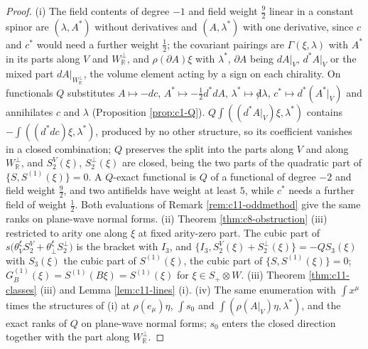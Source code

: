 \begin{proof}
(i) The field contents of degree $-1$ and field weight $\tfrac92$ linear in a constant spinor are $(\lambda,A^*)$ without derivatives and $(A,\lambda^*)$ with one derivative, since $c$ and $c^*$ would need a further weight $\tfrac12$; the covariant pairings are $\Gamma(\xi,\lambda)$ with $A^*$ in its parts along $V$ and $W_{\mathbb R}^\perp$, and $\rho(\partial A)\xi$ with $\lambda^*$, $\partial A$ being $dA|_V$, $d^*A|_V$ or the mixed part $dA|_{W_{\mathbb R}^\perp}$, the volume element acting by a sign on each chirality. On functionals $Q$ substitutes $A\mapsto-dc$, $A^*\mapsto-\tfrac12d^*dA$, $\lambda^*\mapsto{\not d}\lambda$, $c^*\mapsto d^*(A^*|_V)$ and annihilates $c$ and $\lambda$ (Proposition \ref{prop:c1-Q}). $Q\int((d^*A|_V)\xi,\lambda^*)$ contains $-\int((d^*dc)\xi,\lambda^*)$, produced by no other structure, so its coefficient vanishes in a closed combination; $Q$ preserves the split into the parts along $V$ and along $W_{\mathbb R}^\perp$, and $S^V_2(\xi)$, $S^\perp_2(\xi)$ are closed, being the two parts of the quadratic part of $\{S,S^{(1)}(\xi)\}=0$. A $Q$-exact functional is $Q$ of a functional of degree $-2$ and field weight $\tfrac92$, and two antifields have weight at least $5$, while $c^*$ needs a further field of weight $\tfrac12$. Both evaluations of Remark \ref{rem:c11-oddmethod} give the same ranks on plane-wave normal forms. (ii) Theorem \ref{thm:c8-obstruction} (iii) restricted to arity one along $\xi$ at fixed arity-zero part. The cubic part of $s\big(\theta^\xi_VS^V_2+\theta^\xi_\perp S^\perp_2\big)$ is the bracket with $I_3$, and $\{I_3,S^V_2(\xi)+S^\perp_2(\xi)\}=-QS_3(\xi)$ with $S_3(\xi)$ the cubic part of $S^{(1)}(\xi)$, the cubic part of $\{S,S^{(1)}(\xi)\}=0$; $G_B^{(1)}(\xi)=S^{(1)}(B\xi)=S^{(1)}(\xi)$ for $\xi\in S_+\otimes W$. (iii) Theorem \ref{thm:c11-classes} (iii) and Lemma \ref{lem:c11-lines} (i). (iv) The same enumeration with $\int x^\mu$ times the structures of (i) at $\rho(e_\mu)\eta$, $\int s_0$ and $\int(\rho(A|_V)\eta,\lambda^*)$, and the exact ranks of $Q$ on plane-wave normal forms; $s_0$ enters the closed direction together with the part along $W_{\mathbb R}^\perp$.
\end{proof}

